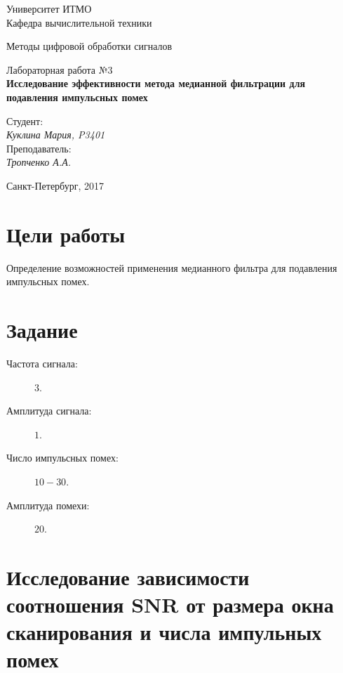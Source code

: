 \documentclass[12pt, a4paper] {ncc}
\begin{document}
\setcounter{figure}{0}
\frenchspacing
\pagestyle{empty}
\begin{center}
							Университет ИТМО	\\
                        Кафедра вычислительной техники

                    Методы цифровой обработки сигналов
\end{center}
\begin{center}
                            Лабораторная работа №3\\
						{\bf Исследование эффективности метода медианной фильтрации для
							подавления импульсных помех}
\end{center}
\begin{flushright}
                                    Студент:\\
                                    {\it Куклина Мария, P3401}\\
									Преподаватель: \\
									{\it Тропченко А.А.}
\end{flushright}
\begin{center}
                             Санкт-Петербург, 2017
\end{center}
\newpage


\section{Цели работы}
    Определение возможностей применения медианного фильтра для подавления импульсных помех.

\section{Задание}

    \begin{description}
        \item[Частота сигнала:] $3$.
        \item[Амплитуда сигнала:] $1$.
        \item[Число импульсных помех:]  $10-30$.
        \item[Амплитуда помехи:] $20$.
    \end{description}


\section{Исследование зависимости соотношения SNR от размера окна сканирования и числа импульных помех}
    
\end{document}

